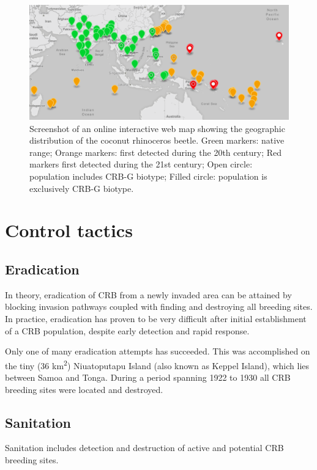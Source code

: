 \documentclass[twocolumn,letterpaper]{scrartcl}
\begin{document}
\begin{figure}[h!]
	\centering
	\includegraphics[width=\linewidth]{images/crb_dist}
	\caption{Screenshot of an online interactive web map \cite{moore_web_2019} showing the geographic distribution of the coconut rhinoceros beetle. Green markers: native range; Orange markers: first detected during the 20th century; Red markers first detected during the 21st century; Open circle: population includes CRB-G biotype; Filled circle: population is exclusively CRB-G biotype.}
	\label{fig:crbdist}
\end{figure}

\section{Control tactics}

\subsection{Eradication}

In theory, eradication of CRB from a newly invaded area can be attained by blocking invasion pathways coupled with finding and destroying all breeding sites. In practice, eradication has proven to be very difficult after initial establishment of a CRB population, despite early detection and rapid response. 

Only one of many eradication attempts has succeeded. This was accomplished on the tiny (36 km\textsuperscript{2}) Niuatoputapu Island (also known as Keppel Island), which lies between Samoa and Tonga. During a period spanning 1922 to 1930 all CRB breeding sites were located and destroyed.

\subsection{Sanitation}

Sanitation includes detection and destruction of active and potential CRB breeding sites.
\end{document}
